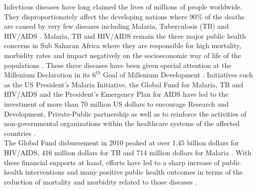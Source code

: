 
\clearpage  %
Infectious diseases have long claimed the lives of millions of people worldwide. They disproportionately affect the developing nations where 90\% of the deaths are caused by very few diseases including Malaria, Tuberculosis (TB) and HIV/AIDS \cite{davis_emerging_2001}. Malaria, TB and HIV/AIDS remain the three major public health concerns in Sub Saharan Africa where they are responsible for high mortality, morbidity rates and impact negatively on the socioeconomic way of life of the populations \cite{gallup_economic_2001,vitoria_global_2009}. These three diseases have been given special attention at the Millenium Declaration in its $6^{th}$ Goal of Millenium Development \cite{assembly_united_2000}. Initiatives such as the US President’s Malaria Initiative, the Global Fund for Malaria, TB and HIV/AIDS and the President’s Emergency Plan for AIDS have led to the investment of more than 70 million US dollars to encourage Research and Development, Private-Public partnership as well as to reinforce the activities of non-governmental organizations within the healthcare systems of the affected countries \cite{arthur_institute_2014,murray_global_2014,stoops_presidents_2008}.\\
The Global Fund disbursement in 2010 peaked at over 1.45 billion dollars for HIV/AIDS, 416 million dollars for TB and 714 million dollars for Malaria \cite{global_fund_making_2011,world_health_organization_world_2012}. With these financial supports at hand, efforts have led to a sharp increase of public health interventions and many positive public health outcomes in terms of the reduction of mortality and morbidity related to those diseases \cite{barat_four_2006}. 
